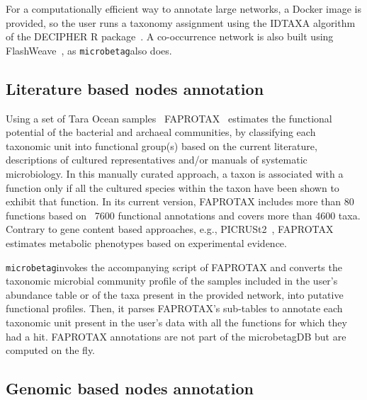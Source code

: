 \documentclass[sn-mathphys,Numbered]{sn-jnl}  %
\theoremstyle{thmstyleone}%
\theoremstyle{thmstyletwo}%
\theoremstyle{thmstylethree}%
\newcommand{\microbetag}{\texttt{microbetag}}
\begin{document}
        For a computationally efficient way to annotate large networks, a Docker image is provided, so the user runs a taxonomy assignment using the IDTAXA algorithm~\cite{murali2018idtaxa} of the DECIPHER R package~\cite{wright2016using}.
        A co-occurrence network is also built using FlashWeave~\cite{flashweave_cite}, as \microbetag also does.


    \subsection*{Literature based nodes annotation}
    \label{subsec:fapro}

        Using a set of Tara Ocean samples~\cite{sunagawa2015structure} FAPROTAX~\cite{louca2016decoupling} estimates the functional potential of the bacterial and archaeal communities, by classifying each taxonomic unit into functional group(s) based on the current literature, descriptions of cultured representatives and/or manuals of systematic microbiology. 
        In this manually curated approach, a taxon is associated with a function only if all the cultured species within the taxon have been shown to exhibit that function. 
        In its current version, FAPROTAX includes more than 80 functions based on ~7600 functional annotations and covers more than 4600 taxa.
        Contrary to gene content based approaches, e.g., PICRUSt2~\cite{douglas2020picrust2}, FAPROTAX  estimates metabolic phenotypes based on experimental evidence. 

        \microbetag invokes the accompanying script of FAPROTAX and converts the taxonomic microbial community profile of the samples included in the user's abundance table or of the taxa present in the provided network, into putative functional profiles.
        Then, it parses FAPROTAX's sub-tables to annotate each taxonomic unit present in the user's data with all the functions for which they had a hit. 
        FAPROTAX annotations are not part of the microbetagDB but are computed on the fly.


    \subsection*{Genomic based nodes annotation}
    \label{subsec:phen}
\end{document}
